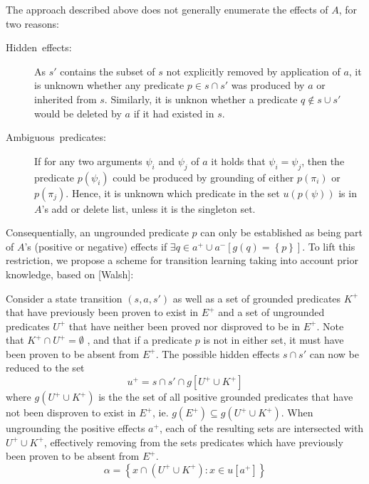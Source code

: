 \documentclass[../master.tex]{subfiles}
\begin{document}
    The approach described above does not generally enumerate the effects
    of $A$, for two reasons:
    \begin{description}
    \item [{Hidden\ effects:}] As $s'$ contains the subset of $s$ not explicitly
    removed by application of $a$, it is unknown whether any predicate
    $p\in s\cap s'$ was produced by $a$ or inherited from $s$. Similarly,
    it is unknon whether a predicate $q\notin s\cup s'$ would be deleted
    by $a$ if it had existed in $s$.
    \item [{Ambiguous\ predicates:}] If for any two arguments $\psi_{i}$
    and $\psi_{j}$ of $a$ it holds that $\psi_{i}=\psi_{j}$, then the
    predicate $p\left(\psi_{i}\right)$ could be produced by grounding
    of either $p\left(\pi_{i}\right)$ or $p\left(\pi_{j}\right)$. Hence,
    it is unknown which predicate in the set $u\left(p\left(\psi\right)\right)$
    is in $A$'s add or delete list, unless it is the singleton set.
    \end{description}
    Consequentially, an ungrounded predicate $p$ can only be established
    as being part of $A$'s (positive or negative) effects if $\exists q\in a^{+}\cup a^{-}\left[g\left(q\right)=\left\{ p\right\} \right]$.
    To lift this restriction, we propose a scheme for transition learning
    taking into account prior knowledge, based on {[}Walsh{]}:

    Consider a state transition $\left(s,a,s'\right)$ as well as a set
    of grounded predicates $K^{+}$ that have previously been proven to
    exist in $E^{+}$ and a set of ungrounded predicates $U^{+}$ that
    have neither been proved nor disproved to be in $E^{+}$. Note that
    $K^{+}\cap U^{+}=\emptyset$ , and that if a predicate $p$ is not
    in either set, it must have been proven to be absent from $E^{+}$.
    The possible hidden effects $s\cap s'$ can now be reduced to the
    set
    \[
    u^{+}=s\cap s'\cap g\left[U^{+}\cup K^{+}\right]
    \]
    where $g\left(U^{+}\cup K^{+}\right)$ is the the set of all positive
    grounded predicates that have not been disproven to exist in $E^{+}$,
    ie. $g\left(E^{+}\right)\subseteq g\left(U^{+}\cup K^{+}\right)$.
    When ungrounding the positive effects $a^{+}$, each of the resulting
    sets are intersected with $U^{+}\cup K^{+}$, effectively removing
    from the sets predicates which have previously been proven to be absent
    from $E^{+}$.
    \[
    \alpha=\left\{ x\cap\left(U^{+}\cup K^{+}\right):x\in u\left[a^{+}\right]\right\}
    \]
\end{document}
